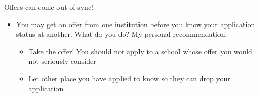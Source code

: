 \begin{frame}[fragile]{Offers can come out of sync!}
\begin{itemize}
    \item You may get an offer from one institution before you know your application status at another.  What do you do?  My personal recommendation:
    \begin{itemize}
        \item Take the offer! You should not apply to a school whose offer you would not seriously consider
        \item Let other place you have applied to know so they can drop your application
    \end{itemize}
\end{itemize}

\end{frame}

